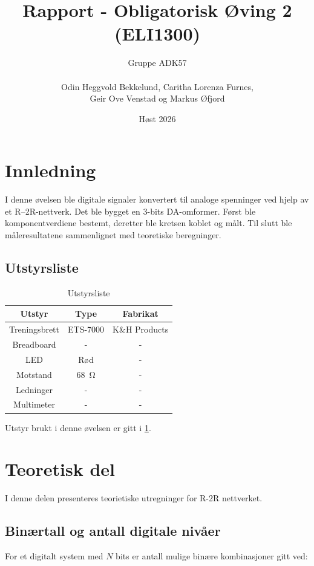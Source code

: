 \documentclass[11pt,a4paper,twocolumn]{article}
\title{Rapport - Obligatorisk Øving 2 (ELI1300)}
\author{
	Gruppe ADK57
	\\\\
	Odin Heggvold Bekkelund, Caritha Lorenza Furnes,
	\\
	Geir Ove Venstad og Markus Øfjord
}
\date{Høst 2026}
\begin{document}
\maketitle %

\section{Innledning}

I denne øvelsen ble digitale signaler konvertert til analoge spenninger ved hjelp av et R–2R-nettverk. Det ble bygget en 3-bits DA-omformer. Først ble komponentverdiene bestemt, deretter ble kretsen koblet og målt. Til slutt ble måleresultatene sammenlignet med teoretiske beregninger.

\subsection{Utstyrsliste}

\begin{table}[h]
\centering
\caption{Utstyrsliste}
\label{equipment}
\setlength{\tabcolsep}{3pt}

\begin{tabular}{c|c|c}
	Utstyr & Type & Fabrikat \\
	\hline
	Treningsbrett & ETS-7000 & K\&H Products \\
	Breadboard & - & - \\
	LED & Rød & - \\
	Motstand & \qty{68}{\ohm} & - \\
	Ledninger & - & - \\
	Multimeter & - & - \\
\end{tabular}
\end{table}

Utstyr brukt i denne øvelsen er gitt i \cref{equipment}.

\section{Teoretisk del}
I denne delen presenteres teorietiske utregninger for R-2R nettverket.

\subsection{Binærtall og antall digitale nivåer}

For et digitalt system med \(N\) bits er antall mulige binære kombinasjoner gitt ved:
\end{document}
